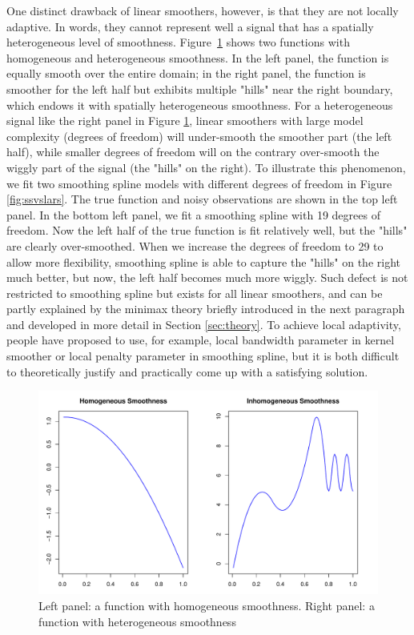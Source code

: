 \documentclass[a4paper]{article}
\begin{document}
One distinct drawback of linear smoothers, however, is that they are not locally adaptive. In words, they cannot represent well a signal that has a spatially heterogeneous level of smoothness. Figure~\ref{fig:homo} shows two functions with homogeneous and heterogeneous smoothness. In the left panel, the function is equally smooth over the entire domain; in the right panel, the function is smoother for the left half but exhibits multiple "hills" near the right boundary, which endows it with spatially heterogeneous smoothness. For a heterogeneous signal like the right panel in Figure \ref{fig:homo}, linear smoothers with large model complexity (degrees of freedom) will under-smooth the smoother part (the left half), while smaller degrees of freedom will on the contrary over-smooth the wiggly part of the signal (the "hills" on the right). To illustrate this phenomenon, we fit two smoothing spline models with different degrees of freedom in Figure \ref{fig:ssvslars}. The true function and noisy observations are shown in the top left panel. In the bottom left panel, we fit a smoothing spline with 19 degrees of freedom. Now the left half of the true function is fit relatively well, but the "hills" are clearly over-smoothed. When we increase the degrees of freedom to 29 to allow more flexibility, smoothing spline is able to capture the "hills" on the right much better, but now, the left half becomes much more wiggly. Such defect is not restricted to smoothing spline but exists for all linear smoothers, and can be partly explained by the minimax theory briefly introduced in the next paragraph and developed in more detail in Section \ref{sec:theory}. To achieve local adaptivity, people have proposed to use, for example, local bandwidth parameter in kernel smoother or local penalty parameter in smoothing spline, but it is both difficult to theoretically justify and practically come up with a satisfying solution.

\begin{figure}[t!]
\centering
\includegraphics[width = 1\textwidth]{Figures/homo.pdf}
\caption{Left panel: a function with homogeneous smoothness. Right panel: a function with heterogeneous smoothness}
\label{fig:homo}
\end{figure}
\end{document}
